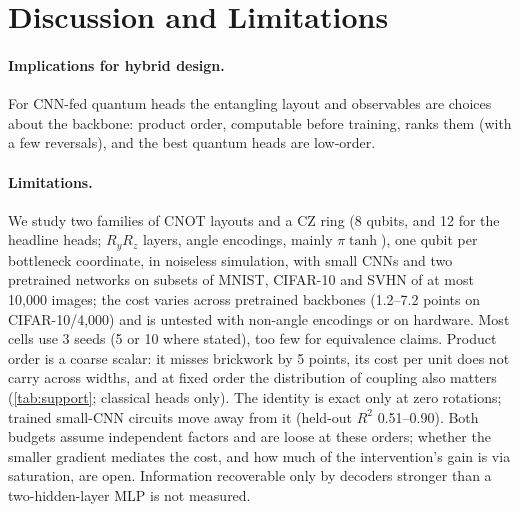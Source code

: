 \section{Discussion and Limitations}
\label{sec:discussion}

\paragraph{Implications for hybrid design.}
For CNN-fed quantum heads the entangling layout and observables are choices about the backbone: product order, computable before training, ranks them (with a few reversals), and the best quantum heads are low-order.

\paragraph{Limitations.}
We study two families of CNOT layouts and a CZ ring (8 qubits, and 12 for the headline heads; $R_yR_z$ layers,
angle encodings, mainly $\pi\tanh$), one qubit per bottleneck coordinate, in noiseless simulation, with small CNNs and two pretrained networks on subsets
of MNIST, CIFAR-10 and SVHN of at most 10,000 images; the cost varies across pretrained backbones (1.2--7.2 points on CIFAR-10/4,000) and is untested with non-angle encodings
or on hardware. Most cells use 3 seeds (5 or 10 where stated), too few
for equivalence claims. Product order is a
coarse scalar: it misses brickwork by 5 points, its cost per unit does not carry across widths, and at fixed order the distribution of coupling also matters (\cref{tab:support}; classical heads only). The identity is exact only at zero rotations; trained small-CNN circuits move away from it (held-out $R^2$ 0.51--0.90). Both budgets assume independent factors and are loose at these orders; whether the smaller gradient mediates the cost, and how much of the intervention's gain is via saturation, are open. Information recoverable only by
decoders stronger than a two-hidden-layer MLP is not measured.
